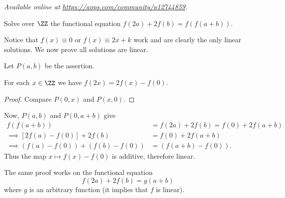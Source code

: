 \textsl{Available online at \url{https://aops.com/community/p12744859}.}
\begin{mdframed}[style=mdpurplebox,frametitle={Problem statement}]
Solve over $\ZZ$ the functional equation
$f(2a) + 2f(b) = f(f(a+b))$.
\end{mdframed}
Notice that $f(x) \equiv 0$ or $f(x) \equiv 2x+k$ work
and are clearly the only linear solutions.
We now prove all solutions are linear.

Let $P(a,b)$ be the assertion.
\begin{claim*}
  For each $x \in \ZZ$ we have $f(2x) = 2f(x) - f(0)$.
\end{claim*}
\begin{proof}
  Compare $P(0,x)$ and $P(x,0)$.
\end{proof}
Now, $P(a,b)$ and $P(0,a+b)$ give
\begin{align*}
  f(f(a+b)) &= f(2a) + 2f(b) = f(0) + 2f(a+b) \\
  \implies [2f(a) - f(0)] + 2f(b) &= f(0) + 2f(a+b) \\
  \implies \left( f(a)-f(0) \right) + \left( f(b)-f(0) \right)
  &= \left( f(a+b)-f(0) \right).
\end{align*}
Thus the map $x \mapsto f(x) - f(0)$ is additive,
therefore linear.

\begin{remark*}
  The same proof works on the functional equation
  \[ f(2a) + 2f(b) = g(a+b) \]
  where $g$ is an arbitrary function (it implies that $f$ is linear).
\end{remark*}
\pagebreak